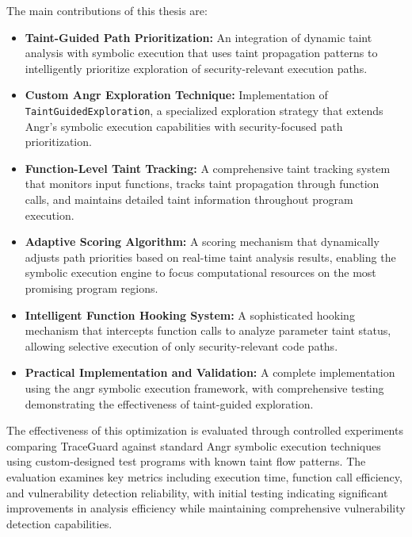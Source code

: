The main contributions of this thesis are:

\begin{itemize}
    \item \textbf{Taint-Guided Path Prioritization:} An integration of dynamic taint analysis with symbolic execution that uses taint propagation patterns to intelligently prioritize exploration of security-relevant execution paths.

    \item \textbf{Custom Angr Exploration Technique:} Implementation of\\ \texttt{TaintGuidedExploration}, a specialized exploration strategy that extends Angr's symbolic execution capabilities with security-focused path prioritization.

    \item \textbf{Function-Level Taint Tracking:} A comprehensive taint tracking system that monitors input functions, tracks taint propagation through function calls, and maintains detailed taint information throughout program execution.

    \item \textbf{Adaptive Scoring Algorithm:} A scoring mechanism that dynamically adjusts path priorities based on real-time taint analysis results, enabling the symbolic execution engine to focus computational resources on the most promising program regions.

    \item \textbf{Intelligent Function Hooking System:} A sophisticated hooking mechanism that intercepts function calls to analyze parameter taint status, allowing selective execution of only security-relevant code paths.

    \item \textbf{Practical Implementation and Validation:} A complete implementation using the angr symbolic execution framework, with comprehensive testing demonstrating the effectiveness of taint-guided exploration.
\end{itemize}

The effectiveness of this optimization is evaluated through controlled experiments comparing TraceGuard against standard Angr symbolic execution techniques using custom-designed test programs with known taint flow patterns. The evaluation examines key metrics including execution time, function call efficiency, and vulnerability detection reliability, with initial testing indicating significant improvements in analysis efficiency while maintaining comprehensive vulnerability detection capabilities.

